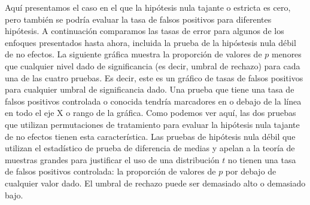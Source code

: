 \documentclass[
]{article}
\newenvironment{Shaded}{\begin{snugshade}}{\end{snugshade}}
\newcommand{\AttributeTok}[1]{\textcolor[rgb]{0.77,0.63,0.00}{#1}}
\newcommand{\ControlFlowTok}[1]{\textcolor[rgb]{0.13,0.29,0.53}{\textbf{#1}}}
\newcommand{\DecValTok}[1]{\textcolor[rgb]{0.00,0.00,0.81}{#1}}
\newcommand{\DocumentationTok}[1]{\textcolor[rgb]{0.56,0.35,0.01}{\textbf{\textit{#1}}}}
\newcommand{\FunctionTok}[1]{\textcolor[rgb]{0.00,0.00,0.00}{#1}}
\newcommand{\NormalTok}[1]{#1}
\newcommand{\OtherTok}[1]{\textcolor[rgb]{0.56,0.35,0.01}{#1}}
\newcommand{\SpecialCharTok}[1]{\textcolor[rgb]{0.00,0.00,0.00}{#1}}
\newcommand{\StringTok}[1]{\textcolor[rgb]{0.31,0.60,0.02}{#1}}
\begin{document}
Aquí presentamos el caso en el que la hipótesis nula tajante o estricta es cero, pero también se podría evaluar la tasa de falsos positivos para diferentes hipótesis. A continuación comparamos las tasas de error para algunos de los enfoques presentados hasta ahora, incluida la prueba de la hipóstesis nula débil de no efectos. La siguiente gráfica muestra la proporción de valores de \(p\) menores que cualquier nivel dado de significancia (es decir, umbral de rechazo) para cada una de las cuatro pruebas. Es decir, este es un gráfico de tasas de falsos positivos para cualquier umbral de significancia dado. Una prueba que tiene una tasa de falsos positivos controlada o conocida tendría marcadores en o debajo de la línea en todo el eje X o rango de la gráfica. Como podemos ver aquí, las dos pruebas que utilizan permutaciones de tratamiento para evaluar la hipótesis nula tajante de no efectos tienen esta característica. Las pruebas de hipótesis nula débil que utilizan el estadístico de prueba de diferencia de medias y apelan a la teoría de muestras grandes para justificar el uso de una distribución \(t\) no tienen una tasa de falsos positivos controlada: la proporción de valores de \(p\) por debajo de cualquier valor dado. El umbral de rechazo puede ser demasiado alto o demasiado bajo.

\begin{Shaded}
\end{Shaded}
\end{document}

